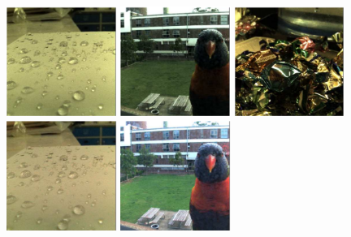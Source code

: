 \documentclass[onecolumn]{article}
\begin{document}
\begin{enumerate}[leftmargin=1.5em,rightmargin=0.5cm]
\begin{figure}[tbh]
	\centering
	\includegraphics[width=0.32\textwidth]{Figs/Sample1}
	\includegraphics[width=0.32\textwidth]{Figs/Sample2}
	\includegraphics[width=0.32\textwidth]{Figs/Sample3}\\
	\includegraphics[width=0.32\textwidth]{Figs/Sample1_ColCorrect}
	\includegraphics[width=0.32\textwidth]{Figs/Sample2_ColCorrect}

\end{figure}
\end{enumerate}
\end{document}
